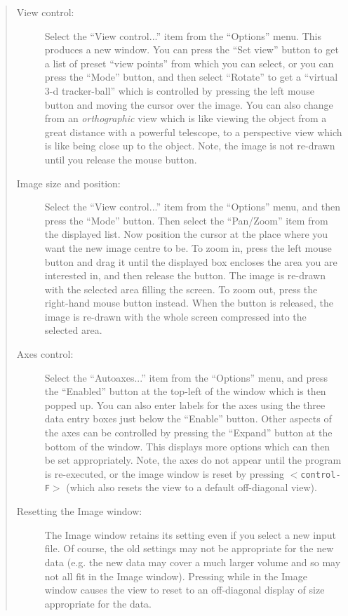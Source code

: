 \begin{quote}
\begin{description}

\item [View control:] Select the ``View control...'' item from
  the ``Options'' menu. This produces a new window. You can
  press the ``Set view'' button to get a list of preset
  ``view points'' from which you can select, or you can press
  the ``Mode'' button, and then select ``Rotate'' to get a
  ``virtual 3-d tracker-ball'' which is controlled by
  pressing the left mouse button and moving the cursor over
  the image. You can also change from an {\em orthographic} view which is
  like viewing the object from a great distance with a powerful telescope,
  to a perspective view which is like being close up to the object.
  Note, the image is not re-drawn until you release the mouse button.

\item [Image size and position:] Select the ``View control...''
  item from the ``Options'' menu, and then press the
  ``Mode'' button. Then select the ``Pan/Zoom'' item from
  the displayed list. Now position the cursor at the place
  where you want the new image centre to be. To zoom in,
  press the left mouse button and drag it until the displayed
  box encloses the area you are interested in, and then
  release the button. The image is re-drawn with the
  selected area filling the screen. To zoom out, press
  the right-hand mouse button instead. When the button
  is released, the image is re-drawn with the whole
  screen compressed into the selected area.

\item [Axes control:] Select the ``Autoaxes...'' item from the
  ``Options'' menu, and press the ``Enabled'' button at the
  top-left of the window which is then popped up. You can
  also enter labels for the axes using the three data entry
  boxes just below the ``Enable'' button. Other aspects of
  the axes can be controlled by pressing the ``Expand''
  button at the bottom of the window. This displays more
  options which can then be set appropriately. Note, the
  axes do not appear until the program is re-executed, or
  the image window is reset by pressing $<${\tt control-F}$>$ (which
  also resets the view to a default off-diagonal view).

\item [Resetting the Image window:] The Image window retains
  its setting even if you select a new input file. Of
  course, the old settings may not be appropriate for the
  new data (e.g. the new data may cover a much larger
  volume and so may not all fit in the Image window).
  Pressing {\tt <control-F>} while in the Image window causes the
  view to reset to an off-diagonal display of size
  appropriate for the data.

\end{description}
\end{quote}

